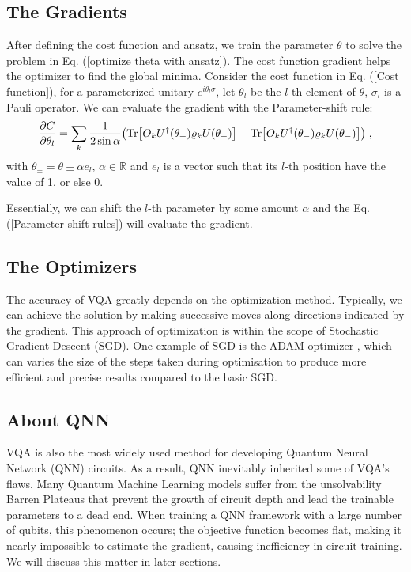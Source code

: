 \subsection{The Gradients}
After defining the cost function and ansatz, we train the parameter $\theta$ to solve the problem in Eq. (\ref{optimize theta with ansatz}).
The cost function gradient helps the optimizer to find the global minima. 
Consider the cost function in Eq. (\ref{Cost function}), for a parameterized unitary $e^{i \theta_l \sigma}$, let $\theta_l$ be the $l$-th element of $\theta$, $\sigma_l$ is a Pauli operator. 
We can evaluate the gradient with the Parameter-shift rule:
\begin{equation}
    \frac{\partial C}{\partial\theta_l}
    = \sum_k \frac{1}{2 \sin{\alpha}} 
    \left( 
        \Tr[O_k U^\dagger(\theta_+) \rho_k U(\theta_+)] 
        - \Tr[O_k U^\dagger(\theta_-) \rho_k U(\theta_-)]
    \right) \;,
    \label{Parameter-shift rules}
\end{equation}
with $\theta_{\pm} = \theta \pm \alpha e_l$, $\alpha \in \mathbb{R}$ and $e_l$ is a vector such that its $l$-th position have the value of 1, or else 0.

Essentially, we can shift the $l$-th parameter by some amount $\alpha$ and the Eq. (\ref{Parameter-shift rules}) will evaluate the gradient. 


\subsection{The Optimizers}
The accuracy of VQA greatly depends on the optimization method.
Typically, we can achieve the solution by making successive moves along directions indicated by the gradient.
This approach of optimization is within the scope of Stochastic Gradient Descent (SGD).
One example of SGD is the ADAM optimizer \cite{kingmaAdamMethodStochastic2014}, which can varies the size of the steps taken during optimisation to produce more efficient and precise results compared to the basic SGD.


\subsection{About QNN}
VQA is also the most widely used method for developing Quantum Neural Network (QNN) circuits. 
As a result, QNN inevitably inherited some of VQA's flaws.
Many Quantum Machine Learning models suffer from the unsolvability Barren Plateaus \cite{zhaoReviewQuantumNeural2021} that prevent the growth of circuit depth and lead the trainable parameters to a dead end.
When training a QNN framework with a large number of qubits, this phenomenon occurs; the objective function becomes flat, making it nearly impossible to estimate the gradient, \cite{mccleanBarrenPlateausQuantum2018, zhaoAnalyzingBarrenPlateau2021} causing inefficiency in circuit training. We will discuss this matter in later sections.

